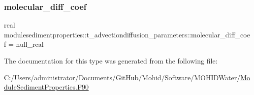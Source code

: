 \subsubsection{\texorpdfstring{molecular\+\_\+diff\+\_\+coef}{molecular\_diff\_coef}}
{\footnotesize\ttfamily real modulesedimentproperties\+::t\+\_\+advectiondiffusion\+\_\+parameters\+::molecular\+\_\+diff\+\_\+coef = null\+\_\+real\hspace{0.3cm}{\ttfamily [private]}}



The documentation for this type was generated from the following file\+:\begin{DoxyCompactItemize}
\item 
C\+:/\+Users/administrator/\+Documents/\+Git\+Hub/\+Mohid/\+Software/\+M\+O\+H\+I\+D\+Water/\mbox{\hyperlink{_module_sediment_properties_8_f90}{Module\+Sediment\+Properties.\+F90}}\end{DoxyCompactItemize}
